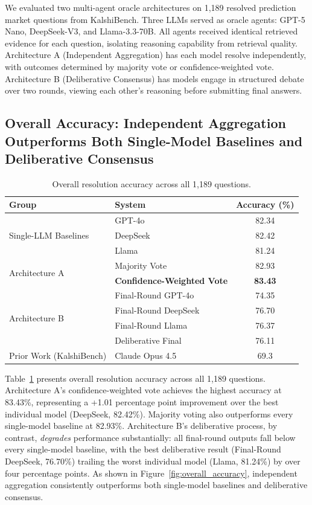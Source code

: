 We evaluated two multi-agent oracle architectures on 1,189 resolved prediction market questions from KalshiBench. Three LLMs served as oracle agents: GPT-5 Nano, DeepSeek-V3, and 
Llama-3.3-70B. All agents received identical retrieved evidence for each question, isolating reasoning capability from retrieval quality. Architecture A (Independent Aggregation) has each model resolve independently, with outcomes determined by majority vote or confidence-weighted vote. Architecture B (Deliberative Consensus) has models engage in structured debate over two rounds, viewing each other's reasoning before submitting final answers.

\subsection{Overall Accuracy: Independent Aggregation Outperforms Both Single-Model Baselines and Deliberative Consensus}

\begin{table}[t]
\centering
\begin{tabular}{llc}
\toprule
\textbf{Group} & \textbf{System} & \textbf{Accuracy (\%)} \\
\midrule
\multirow{3}{*}{Single-LLM Baselines}
    & GPT-4o          & 82.34 \\
    & DeepSeek        & 82.42 \\
    & Llama           & 81.24 \\
\midrule
\multirow{2}{*}{Architecture A}
    & Majority Vote            & 82.93 \\
    & \textbf{Confidence-Weighted Vote} & \textbf{83.43} \\
\midrule
\multirow{4}{*}{Architecture B}
    & Final-Round GPT-4o       & 74.35 \\
    & Final-Round DeepSeek     & 76.70 \\
    & Final-Round Llama        & 76.37 \\
    & Deliberative Final       & 76.11 \\
\midrule
Prior Work (KalshiBench)
    & Claude Opus 4.5          & 69.3 \\
\bottomrule
\end{tabular}
\caption{Overall resolution accuracy across all 1,189 questions.}
\label{tab:overall}
\end{table}

Table~\ref{tab:overall} presents overall resolution accuracy across all 1,189 questions. Architecture A's confidence-weighted vote achieves the highest accuracy at 83.43\%, representing a +1.01 percentage point improvement over the best individual model (DeepSeek, 82.42\%). Majority voting also outperforms every single-model baseline at 82.93\%. Architecture B's deliberative process, by contrast, \emph{degrades} performance substantially: all final-round outputs fall below every single-model baseline, with the best deliberative result (Final-Round DeepSeek, 76.70\%) trailing the worst individual model (Llama, 81.24\%) by over four percentage points. As shown in Figure~\ref{fig:overall_accuracy}, independent aggregation consistently outperforms both single-model baselines and deliberative consensus.

